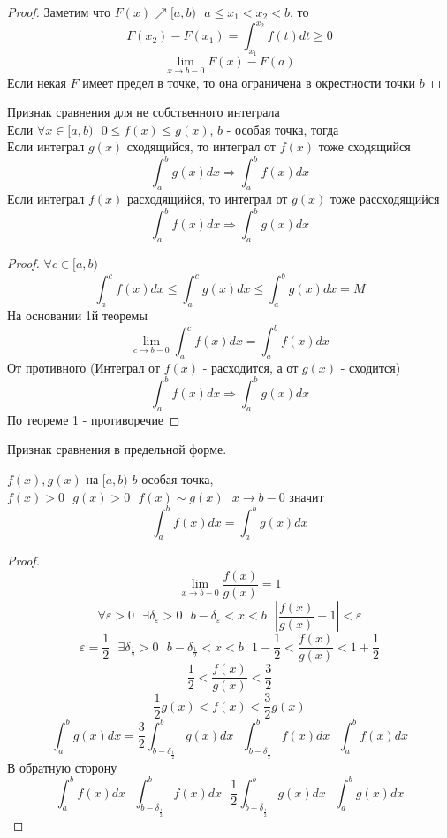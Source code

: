 \begin{proof}
  Заметим что $F(x) \nearrow [a, b) ~~~ a \le x_1 < x_2 < b$, то
  \[
    F(x_2) - F(x_1) = \int^{x_2}_{x_1} f(t)dt \ge 0
  \]
  \[
    \lim_{x \to b - 0} F(x) - F(a)
  \]
  Если некая $F$ имеет предел в точке, то она ограничена в окрестности точки $b$
\end{proof}

\begin{theorem}[2]
  Признак сравнения для не собственного интеграла\\
  Если $\forall x \in [a, b) ~~~ 0 \le f(x) \le g(x)$, $b$ - особая точка,
  тогда\\
   Если интеграл $g(x)$ сходящийся, то интеграл от $f(x)$ тоже сходящийся
  \[\int^{b}_{a} g(x)dx \Rightarrow \int^{b}_{a} f(x)dx\]
   Если интеграл $f(x)$ расходящийся, то интеграл от $g(x)$ тоже
  рассходящийся
  \[\int^{b}_{a} f(x)dx \Rightarrow \int^{b}_{a} g(x)dx\]
\end{theorem}

\begin{proof}
  $\forall c \in [a, b)$
  \[
    \int^{c}_{a} f(x)dx \le \int^{c}_{a} g(x)dx \le \int^{b}_{a} g(x)dx = M
  \]
  На основании 1й теоремы
  \[
    \lim_{c \to b - 0} \int^{c}_{a} f(x)dx = \int^{b}_{a} f(x)dx
  \]
   От противного (Интеграл от $f(x)$ - расходится, а от $g(x)$ -
  сходится)
  \[
    \int^{b}_{a} f(x)dx \Rightarrow \int^{b}_{a} g(x)dx
  \]
  По теореме 1 - противоречие
\end{proof}

\begin{title}[\Large]
  Признак сравнения в предельной форме.
\end{title}

\begin{theorem}
  $f(x), g(x)$ на $[a, b)$ $b$ особая точка, $f(x) > 0 ~~~ g(x) > 0 ~~~
  f(x) \sim g(x) ~~~ x \to b -0$ значит
  $$
  \int_a^b f(x)dx = \int_a^b g(x)dx
  $$
\end{theorem}

\begin{proof}
  $$
  \lim_{x \to b-0} \frac{f(x)}{g(x)} = 1
  $$
  $$
  \forall \varepsilon > 0 ~~~ \exists \delta_{\varepsilon} > 0 ~~~
  b - \delta_{\varepsilon} < x < b ~~~ \left| \frac{f(x)}{g(x)} - 1 \right|
  < \varepsilon
  $$
  $$
  \varepsilon = \frac{1}{2} ~~~ \exists \delta_{\frac{1}{2}} > 0 ~~~
  b - \delta_{\frac{1}{2}} < x < b ~~~
  1 - \frac{1}{2} < \frac{f(x)}{g(x)} < 1 + \frac{1}{2}
  $$
  $$
  \frac{1}{2} < \frac{f(x)}{g(x)} < \frac{3}{2}
  $$
  $$
  \frac{1}{2} g(x) < f(x) < \frac{3}{2} g(x)
  $$
  $$
  \int_a^b g(x)dx = \frac{3}{2} \int_{b - \delta_{\frac{1}{2}}}^b g(x)dx ~~~
  \int_{b - \delta_{\frac{1}{2}}}^b f(x)dx ~~~
  \int_a^b f(x)dx
  $$
  В обратную сторону
  $$
  \int_a^b f(x)dx ~~~
  \int_{b - \delta_{\frac{1}{2}}}^b f(x)dx ~~~
  \frac{1}{2} \int_{b - \delta_{\frac{1}{2}}}^b g(x)dx ~~~
  \int_a^b g(x)dx
  $$
\end{proof}

